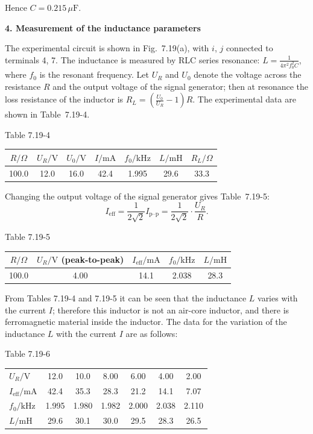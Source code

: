 Hence $C=0.215\,\mu\mathrm{F}$.

\textbf{4. Measurement of the inductance parameters}

The experimental circuit is shown in Fig.~7.19(a), with $i$, $j$ connected to terminals 4, 7. The inductance is measured by RLC series resonance: $L=\frac{1}{4\pi^2 f_0^2 C}$, where $f_0$ is the resonant frequency. Let $U_R$ and $U_0$ denote the voltage across the resistance $R$ and the output voltage of the signal generator; then at resonance the loss resistance of the inductor is $R_L=\left(\frac{U_0}{U_R}-1\right)R$. The experimental data are shown in Table~7.19-4.

\begin{center}
{\small Table 7.19-4}\\[2pt]
\begin{tabular}{ccccccc}
\toprule
$R/\Omega$ & $U_R/\mathrm{V}$ & $U_0/\mathrm{V}$ & $I/\mathrm{mA}$ & $f_0/\mathrm{kHz}$ & $L/\mathrm{mH}$ & $R_L/\Omega$\\
\midrule
100.0 & 12.0 & 16.0 & 42.4 & 1.995 & 29.6 & 33.3\\
\bottomrule
\end{tabular}
\end{center}

Changing the output voltage of the signal generator gives Table~7.19-5:
\[
I_{\text{eff}}=\frac{1}{2\sqrt{2}}I_{\text{p--p}}=\frac{1}{2\sqrt{2}}\cdot\frac{U_R}{R}.
\]

\begin{center}
{\small Table 7.19-5}\\[2pt]
\begin{tabular}{ccccc}
\toprule
$R/\Omega$ & $U_R/\mathrm{V}$ (peak-to-peak) & $I_{\text{eff}}/\mathrm{mA}$ & $f_0/\mathrm{kHz}$ & $L/\mathrm{mH}$\\
\midrule
100.0 & 4.00 & 14.1 & 2.038 & 28.3\\
\bottomrule
\end{tabular}
\end{center}

From Tables 7.19-4 and 7.19-5 it can be seen that the inductance $L$ varies with the current $I$; therefore this inductor is not an air-core inductor, and there is ferromagnetic material inside the inductor. The data for the variation of the inductance $L$ with the current $I$ are as follows:

\begin{center}
{\small Table 7.19-6}\\[2pt]
\begin{tabular}{lcccccc}
\toprule
$U_R/\mathrm{V}$ & 12.0 & 10.0 & 8.00 & 6.00 & 4.00 & 2.00\\
$I_{\text{eff}}/\mathrm{mA}$ & 42.4 & 35.3 & 28.3 & 21.2 & 14.1 & 7.07\\
$f_0/\mathrm{kHz}$ & 1.995 & 1.980 & 1.982 & 2.000 & 2.038 & 2.110\\
$L/\mathrm{mH}$ & 29.6 & 30.1 & 30.0 & 29.5 & 28.3 & 26.5\\
\bottomrule
\end{tabular}
\end{center}

